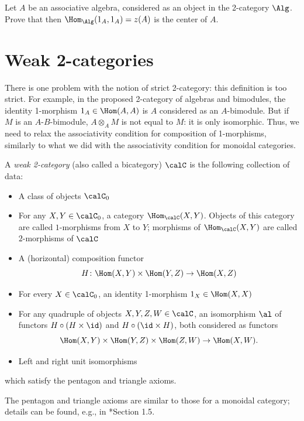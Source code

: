 \begin{exercise}\label{ec:algebra-in-2cat}
  Let $A$ be an associative algebra, considered as an object in the 2-category
  $\Alg$. Prove that then $\Hom_{\Alg}(1_A, 1_A)=z(A)$ is the center of $A$.
\end{exercise}
\section{Weak 2-categories}\label{s:weak-2cat}
There is one problem with the notion of strict 2-category: this definition is
too strict. For example, in the proposed 2-category of algebras and bimodules,
the identity 1-morphism $1_A\in \Hom(A,A)$ is $A$ considered as an $A$-bimodule.
But if $M$ is an $A$-$B$-bimodule, $A\otimes_A M$ is not equal to $M$: it is only
isomorphic. Thus, we need to relax the associativity condition for composition
of 1-morphisms, similarly to what we did with the associativity condition for
monoidal categories.

\begin{definition}\label{d:2-cat-weak}
  A \emph{weak 2-category} (also called a bicategory) $\calC$ is the following
  collection of data:
  \begin{itemize}
    \item A class of objects $\calC_0$
    \item For any $X, Y\in \calC_0$, a category $\Hom_\calC(X,Y)$. Objects of
      this category are called $1$-morphisms from $X$ to $Y$; morphisms of
      $\Hom_\calC(X,Y)$ are called $2$-morphisms of $\calC$
    \item A (horizontal) composition functor
      $$
        H\colon \Hom(X,Y)\times \Hom(Y,Z)\to \Hom(X,Z)
      $$
    \item For every $X\in \calC_0$, an identity 1-morphism $1_X\in \Hom(X,X)$
    \item For any quadruple of objects $X,Y,Z,W\in \calC$, an isomorphism
      $\al$ of functors $H\circ (H\times \id)$ and $H\circ (\id \times H)$,
      both considered as functors
      $$
        \Hom(X,Y)\times \Hom(Y,Z)\times\Hom(Z,W)\to \Hom(X,W).
      $$
    \item Left and right unit isomorphisms
  \end{itemize}
  which satisfy the pentagon and triangle axioms.
\end{definition}
The pentagon and triangle axioms are similar to those for a monoidal category;
details can be found, e.g., in *{Section 1.5}.

